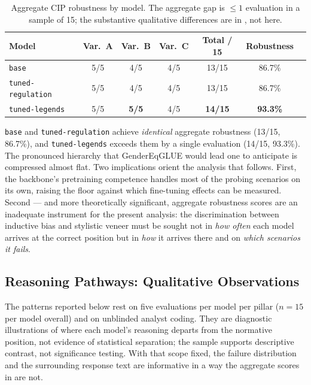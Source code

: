 \documentclass[pdflatex, sn-apa]{sn-jnl}%
\theoremstyle{thmstyleone}%
\theoremstyle{thmstyletwo}%
\theoremstyle{thmstylethree}%
\newcommand{\best}[1]{\textcolor{bestred}{\textbf{#1}}}
\newcommand{\modelbase}{\texttt{base}}
\newcommand{\modellegends}{\texttt{tuned-legends}}
\newcommand{\modelreg}{\texttt{tuned-regulation}}
\begin{document}
\begin{table}[h]
\centering
\caption{Aggregate CIP robustness by model. The aggregate gap is $\leq 1$
evaluation in a sample of 15; the substantive qualitative differences are in
, not here.}
\label{tab:cip_aggregate}
\small
\begin{tabular}{@{}lcccccc@{}}
\toprule
Model           & Var.\ A & Var.\ B & Var.\ C & Total / 15 & Robustness \\
\midrule
\modelbase      & 5/5     & 4/5     & 4/5     & 13/15      & 86.7\%     \\
\modelreg       & 5/5     & 4/5     & 4/5     & 13/15      & 86.7\%     \\
\modellegends   & 5/5     & \best{5/5} & 4/5  & \best{14/15} & \best{93.3\%} \\
\bottomrule
\end{tabular}
\end{table}

\modelbase{} and \modelreg{} achieve \emph{identical} aggregate robustness
(13/15, 86.7\%), and \modellegends{} exceeds them by a single evaluation (14/15,
93.3\%). The pronounced hierarchy that GenderEqGLUE would lead one to anticipate
is compressed almost flat. Two implications orient the analysis that follows.
First, the backbone's pretraining competence handles most of the probing
scenarios on its own, raising the floor against which fine-tuning effects can be
measured. Second --- and more theoretically significant, aggregate robustness
scores are an inadequate instrument for the present analysis: the discrimination
between inductive bias and stylistic veneer must be sought not in \emph{how
often} each model arrives at the correct position but in \emph{how} it arrives
there and on \emph{which scenarios it fails}.

\subsection{Reasoning Pathways: Qualitative Observations}
\label{sec:cip:pathways}

The patterns reported below rest on five evaluations per model per pillar
(\(n=15\) per model overall) and on unblinded analyst coding. They are
diagnostic illustrations of where each model's reasoning departs from the
normative position, not evidence of statistical separation; the sample
supports descriptive contrast, not significance testing. With that scope
fixed, the failure distribution and the surrounding response text are
informative in a way the aggregate scores in  are
not.
\end{document}
